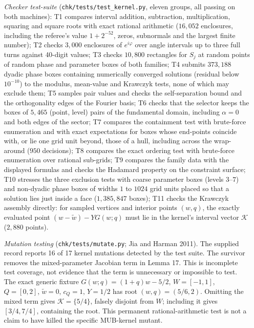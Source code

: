 \documentclass[
  11pt,
]{article}
\newcounter{none} %
\begin{document}
\emph{Checker test-suite} (\texttt{chk/tests/test\_kernel.py}, eleven
groups, all passing on both machines): T1 compares interval addition,
subtraction, multiplication, squaring and square roots with exact
rational arithmetic (\(16{,}052\) enclosures, including the referee's
value \(1+2^{-52}\), zeros, subnormals and the largest finite number);
T2 checks \(3{,}000\) enclosures of \(e^{i\varphi}\) over angle
intervals up to three full turns against 40-digit values; T3 checks
\(10{,}800\) rectangles for \(S_j\) at random points of random phase and
parameter boxes of both families; T4 submits \(373{,}188\) dyadic phase
boxes containing numerically converged solutions (residual below
\(10^{-10}\)) to the modulus, mean-value and Krawczyk tests, none of
which may exclude them; T5 samples pair values and checks the
self-separation bound and the orthogonality edges of the Fourier basis;
T6 checks that the selector keeps the boxes of \(5{,}465\) (point,
level) pairs of the fundamental domain, including \(\alpha=0\) and both
edges of the sector; T7 compares the containment test with brute-force
enumeration and with exact expectations for boxes whose end-points
coincide with, or lie one grid unit beyond, those of a hull, including
across the wrap-around (\(950\) decisions); T8 compares the exact
ordering test with brute-force enumeration over rational sub-grids; T9
compares the family data with the displayed formulas and checks the
Hadamard property on the constraint surface; T10 stresses the three
exclusion tests with coarse parameter boxes (levels \(3\)--\(7\)) and
non-dyadic phase boxes of widths \(1\) to \(1024\) grid units placed so
that a solution lies just inside a face (\(1{,}385{,}847\) boxes); T11
checks the Krawczyk assembly directly: for sampled vertices and interior
points \((w,q)\), the exactly evaluated point \((w-\tilde w)-YG(w;q)\)
must lie in the kernel's interval vector \(\mathcal K\) (\(2{,}880\)
points).

\emph{Mutation testing} (\texttt{chk/tests/mutate.py}; Jia and Harman
2011). The supplied record reports 16 of 17 kernel mutations detected by
the test suite. The survivor removes the mixed-parameter Jacobian term
in Lemma 17. This is incomplete test coverage, not evidence that the
term is unnecessary or impossible to test. The exact generic fixture
\(G(w;q)=(1+q)w-5/2\), \(W=[-1,1]\), \(Q=[0,2]\), \(\tilde w=0\),
\(c_Q=1\), \(Y=1/2\) has root \((w,q)=(5/6,2)\). Omitting the mixed term
gives \(\mathcal K=\{5/4\}\), falsely disjoint from \(W\); including it
gives \([3/4,7/4]\), containing the root. This permanent
rational-arithmetic test is not a claim to have killed the specific
MUB-kernel mutant.
\end{document}

